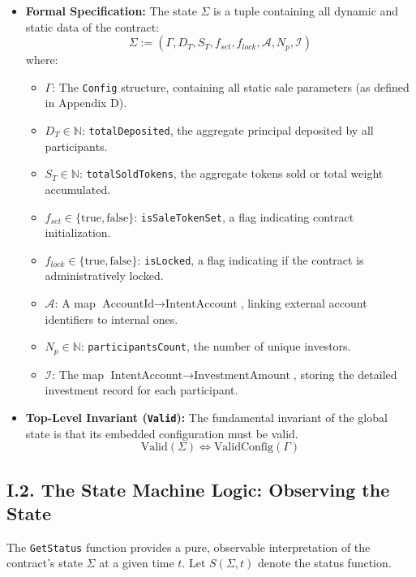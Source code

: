 \documentclass[
  english,
  onecolumn]{article}
\providecommand{\tightlist}{%
  \setlength{\itemsep}{0pt}\setlength{\parskip}{0pt}}
\begin{document}
\begin{itemize}
\tightlist
\item
  \textbf{Formal Specification:} The state \(\Sigma\) is a tuple
  containing all dynamic and static data of the contract:
  \[ \Sigma := (\Gamma, D_T, S_T, f_{set}, f_{lock}, \mathcal{A}, N_p, \mathcal{I}) \]
  where:

  \begin{itemize}
  \tightlist
  \item
    \(\Gamma\): The \texttt{Config} structure, containing all static
    sale parameters (as defined in Appendix D).
  \item
    \(D_T \in \mathbb{N}\): \texttt{totalDeposited}, the aggregate
    principal deposited by all participants.
  \item
    \(S_T \in \mathbb{N}\): \texttt{totalSoldTokens}, the aggregate
    tokens sold or total weight accumulated.
  \item
    \(f_{set} \in \{ \text{true}, \text{false} \}\):
    \texttt{isSaleTokenSet}, a flag indicating contract initialization.
  \item
    \(f_{lock} \in \{ \text{true}, \text{false} \}\): \texttt{isLocked},
    a flag indicating if the contract is administratively locked.
  \item
    \(\mathcal{A}\): A map
    \(\text{AccountId} \to \text{IntentAccount}\), linking external
    account identifiers to internal ones.
  \item
    \(N_p \in \mathbb{N}\): \texttt{participantsCount}, the number of
    unique investors.
  \item
    \(\mathcal{I}\): The map
    \(\text{IntentAccount} \to \text{InvestmentAmount}\), storing the
    detailed investment record for each participant.
  \end{itemize}
\item
  \textbf{Top-Level Invariant (\texttt{Valid}):} The fundamental
  invariant of the global state is that its embedded configuration must
  be valid. \[ \text{Valid}(\Sigma) \iff \text{ValidConfig}(\Gamma) \]
\end{itemize}

\subsection{I.2. The State Machine Logic: Observing the
State}\label{i.2.-the-state-machine-logic-observing-the-state}

The \texttt{GetStatus} function provides a pure, observable
interpretation of the contract's state \(\Sigma\) at a given time \(t\).
Let \(S(\Sigma, t)\) denote the status function.
\end{document}
